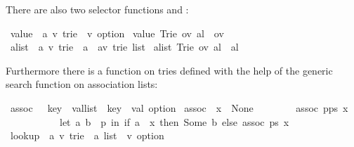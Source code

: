 \begin{isabellebody}
\begin{isamarkuptext}
There are also two selector functions  and :%
\end{isamarkuptext}%
\isamarkuptrue%
\ value\ {\isacharcolon}{\isacharcolon}\ {\isachardoublequote}{\isacharparenleft}{\isacharprime}a{\isacharcomma}\ {\isacharprime}v{\isacharparenright}\ trie\ {\isasymRightarrow}\ {\isacharprime}v\ option{\isachardoublequote}\isanewline
\isamarkupfalse%
\ {\isachardoublequote}value\ {\isacharparenleft}Trie\ ov\ al{\isacharparenright}\ {\isacharequal}\ ov{\isachardoublequote}\ \isanewline
\isanewline
\isamarkupfalse%
\ alist\ {\isacharcolon}{\isacharcolon}\ {\isachardoublequote}{\isacharparenleft}{\isacharprime}a{\isacharcomma}\ {\isacharprime}v{\isacharparenright}\ trie\ {\isasymRightarrow}\ {\isacharparenleft}{\isacharprime}a\ {\isacharasterisk}\ {\isacharparenleft}{\isacharprime}a{\isacharcomma}{\isacharprime}v{\isacharparenright}\ trie{\isacharparenright}\ list{\isachardoublequote}\isanewline
\isamarkupfalse%
\ {\isachardoublequote}alist\ {\isacharparenleft}Trie\ ov\ al{\isacharparenright}\ {\isacharequal}\ al{\isachardoublequote}\isamarkupfalse%
%
\begin{isamarkuptext}%
Furthermore there is a function  on tries
defined with the help of the generic search function  on
association lists:%
\end{isamarkuptext}%
\isamarkuptrue%
\ assoc\ {\isacharcolon}{\isacharcolon}\ \ {\isachardoublequote}{\isacharparenleft}{\isacharprime}key\ {\isacharasterisk}\ {\isacharprime}val{\isacharparenright}list\ {\isasymRightarrow}\ {\isacharprime}key\ {\isasymRightarrow}\ {\isacharprime}val\ option{\isachardoublequote}\isanewline
\isamarkupfalse%
\ {\isachardoublequote}assoc\ {\isacharbrackleft}{\isacharbrackright}\ x\ {\isacharequal}\ None{\isachardoublequote}\isanewline
\ \ \ \ \ \ \ \ {\isachardoublequote}assoc\ {\isacharparenleft}p{\isacharhash}ps{\isacharparenright}\ x\ {\isacharequal}\isanewline
\ \ \ \ \ \ \ \ \ \ \ {\isacharparenleft}let\ {\isacharparenleft}a{\isacharcomma}\ b{\isacharparenright}\ {\isacharequal}\ p\ in\ if\ a\ {\isacharequal}\ x\ then\ Some\ b\ else\ assoc\ ps\ x{\isacharparenright}{\isachardoublequote}\isanewline
\isanewline
\isamarkupfalse%
\ lookup\ {\isacharcolon}{\isacharcolon}\ {\isachardoublequote}{\isacharparenleft}{\isacharprime}a{\isacharcomma}\ {\isacharprime}v{\isacharparenright}\ trie\ {\isasymRightarrow}\ {\isacharprime}a\ list\ {\isasymRightarrow}\ {\isacharprime}v\ option{\isachardoublequote}\isanewline

\end{isabellebody}

